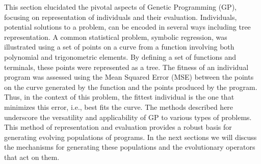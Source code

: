   This section elucidated the pivotal aspects of Genetic Programming (GP), 
  focusing on representation of individuals and their evaluation.
  Individuals, potential solutions to a problem, can be encoded in several ways
  including tree representation.
  A common statistical problem, symbolic regression, was illustrated using a set
  of points on a curve from a function involving both polynomial and
  trigonometric elements.
  By defining a set of functions and terminals, these points were represented as
  a tree.
  The fitness of an individual program was assessed using the Mean Squared Error
  (MSE) between the points on the curve generated by the function and the points
  produced by the program.
  Thus, in the context of this problem, the fittest individual is the one that
  minimizes this error, i.e., best fits the curve.
  The methods described here underscore the versatility and applicability of GP
  to various types of problems.
  This method of representation and evaluation provides a robust basis for
  generating evolving populations of programs. 
  In the next sections we will discuss the mechanisms for generating these
  populations and the evolutionary operators that act on them.
